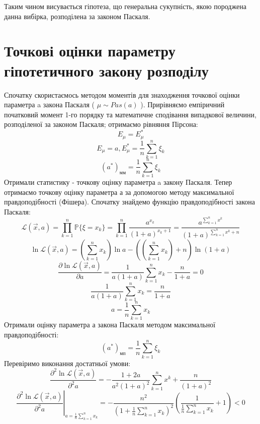 \documentclass{article}
\begin{document}
\newline
Таким чином висувається гіпотеза, що генеральна сукупність, 
якою породжена данна вибірка, розподілена за законом Паскаля.
\newpage
\section{Точкові оцінки параметру гіпотетичного закону розподілу}
Спочатку скористаємось методом моментів для знаходження точкової 
оцінки параметра a закона Паскаля ( $\mu \sim Pas(a)$ ).
\newline
Прирівняємо емпіричний початковий момент 1-го порядку та математичне 
сподівання випадкової величини, розподіленої за законом Паскаля; 
отримаємо рівняння Пірсона: 
$$E_\mu = E^*_\mu$$
$$E_\mu = a, E^*_\mu = \frac{1}{n} \sum_{k = 1}^n \xi_k$$
\begin{equation}
  (a^*)_\text{мм} = \frac{1}{n} \sum_{k = 1}^n \xi_k
\end{equation}
Отримали статистику - точкову оцінку параметра a закону Паскаля.
\newline
Тепер отримаємо точкову оцінку параметра а за допомогою методу 
максимальної правдоподібності (Фішера). Спочатку знайдемо функцію 
правдоподібності закона Паскаля: 
$$\mathcal{L}( \vec{x}, a ) = \prod_{k = 1}^n \mathbb{P} 
\{\xi = x_k\} = \prod_{k = 1}^n \frac{a^{x_k}}{(1 + a)^{x_k + 1}} = 
\frac{a^{\sum_{k =1}^n x^k}}{(1 + a)^{\sum_{k =1}^n x^k + n}}$$
$$\ln \mathcal{L}( \vec{x}, a ) = (\sum_{k=1}^n x_k)\ln a - 
((\sum_{k=1}^n x_k) + n)\ln(1+a)$$
\begin{equation}
  \frac{\partial\ln \mathcal{L}( \vec{x}, a )}{\partial a} = 
  \frac{1}{a(1+a)}\sum_{k=1}^n x_k - \frac{n}{1+a} = 0
\end{equation}
$$\frac{1}{a(1+a)}\sum_{k=1}^n x_k = \frac{n}{1+a}$$
$$a = \frac{1}{n} \sum_{k=1}^n x_k$$
Отримали оцінку параметра а закона Паскаля методом 
максимальної правдоподібності:
\begin{equation}
  (a^*)_\text{мп} = \frac{1}{n}\sum_{k=1}^n \xi_k
\end{equation}
Перевіримо виконання достатньої умови:
$$\frac{\partial^2\ln \mathcal{L}( \vec{x}, a )}{\partial^2 a} = 
-\frac{1+2a}{a^2(1+a)^2}\sum_{k=1}^n x^k + \frac{n}{(1+a)^2}$$
\begin{equation}
  \left.{\frac{\partial^2\ln \mathcal{L}( \vec{x}, a )}{\partial^2 a}}
  \right|_{a = \frac{1}{n} \sum_{k=1}^n x_k} = -\frac{n^2}{(1+\frac{1}{n} \sum_{k=1}^n x_k)^2}\left({\frac{1}{\frac{1}{n} \sum_{k=1}^n x_k} + 1}\right) < 0
\end{equation}
\end{document}
